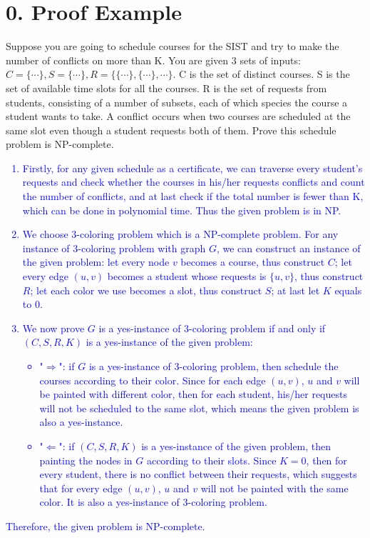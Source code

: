 \documentclass{article}
\begin{document}
\section*{0. Proof Example}
Suppose you are going to schedule courses for the SIST and try to make the number of conflicts on more than K. You are given 3 sets of inputs: $C=\{\cdots\},S=\{\cdots\},R=\{\{\cdots\},\{\cdots\},\cdots\}$. C is the set of distinct courses. S is the set of available time slots for all the courses. R is the set of requests from students, consisting of a number of subsets, each of which species the course a student wants to take. A conflict occurs when two courses are scheduled at the same slot even though a student requests both of them. Prove this schedule problem is NP-complete.\\
\textcolor{blue}{
	\begin{enumerate}
		\item Firstly, for any given schedule as a certificate, we can traverse every student's requests and check whether the courses in his/her requests conflicts and count the number of conflicts, and at last check if the total number is fewer than K, which can be done in polynomial time. Thus the given problem is in NP.
		\item We choose 3-coloring problem which is a NP-complete problem. For any instance of 3-coloring problem with graph $G$, we can construct an instance of the given problem: let every node $v$ becomes a course, thus construct $C$; let every edge $(u,v)$ becomes a student whose requests is $\{u,v\}$, thus construct $R$; let each color we use becomes a slot, thus construct $S$; at last let $K$ equals to $0$.
		\item We now prove $G$ is a yes-instance of 3-coloring problem if and only if $(C,S,R,K)$ is a yes-instance of
		the given problem:
		\begin{itemize}
			\item "$\Rightarrow$": if $G$ is a yes-instance of 3-coloring problem, then schedule the courses according to their color. Since for each edge $(u,v)$, $u$ and $v$ will be painted with different color, then for each student, his/her requests will not be scheduled to the same slot, which means the given problem is also a yes-instance.
			\item "$\Leftarrow$": if $(C,S,R,K)$ is a yes-instance of the given problem, then painting the nodes in $G$ according to their slots. Since $K=0$, then for every student, there is no conflict between their requests, which suggests that for every edge $(u,v)$, $u$ and $v$ will not be painted with the same color. It is also a yes-instance of 3-coloring problem.
		\end{itemize}
	\end{enumerate}
	Therefore, the given problem is NP-complete.
}
\newpage
\end{document}
